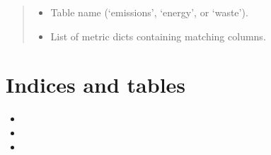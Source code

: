 \documentclass[letterpaper,10pt,english]{sphinxmanual}
\begin{document}
\begin{fulllineitems}
\begin{fulllineitems}
\begin{quote}
\begin{description}
\begin{itemize}
\item {} 
\sphinxAtStartPar
{} \textendash{} Table name (‘emissions’, ‘energy’, or ‘waste’).

\item {} 
\sphinxAtStartPar
{} \textendash{} List of metric dicts containing matching columns.

\end{itemize}

\end{description}\end{quote}

\end{fulllineitems}


\end{fulllineitems}



\chapter{Indices and tables}
\label{\detokenize{index:indices-and-tables}}\begin{itemize}
\item {} 
\sphinxAtStartPar
{}

\item {} 
\sphinxAtStartPar
{}

\item {} 
\sphinxAtStartPar
{}

\end{itemize}


\renewcommand{\indexname}{Python Module Index}
\begin{sphinxtheindex}
\let\bigletter\sphinxstyleindexlettergroup
\bigletter{s}
\item\relax{}
\item\relax{}
\item\relax{}
\item\relax{}
\end{sphinxtheindex}

\renewcommand{\indexname}{Index}
\printindex
\end{document}
